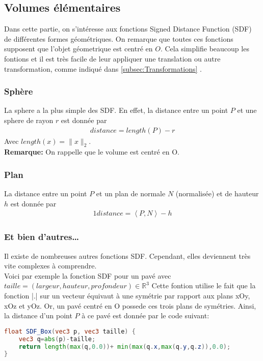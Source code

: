 \subsection{Volumes élémentaires}
Dans cette partie, on s'intéresse aux fonctions Signed Distance Function (SDF) de différentes formes géométriques. On remarque que toutes ces fonctions supposent que l'objet géometrique est centré en $O$. Cela simplifie beaucoup les fontions et il est très facile de leur appliquer une translation ou autre transformation, comme indiqué dans \ref{subsec:Transformations} .
\subsubsection{Sphère}
La sphere a la plus simple des SDF. En effet, la distance entre un point $P$ et une sphere de rayon $r$ est donnée par 
\begin{align*}
distance=length(P)-r
\end{align*}
Avec $length(x)=\|x\|_2$.
\\\textbf{Remarque:} On rappelle que le volume est centré en O.
\subsubsection{Plan}
La distance entre un point $P$ et un plan de normale $N$ (normalisée) et de hauteur $h$ est donnée par 
\begin{alignat*}{1}
    distance=\left\langle P,N \right\rangle - h
\end{alignat*}
\subsubsection{Et bien d'autres\ldots}
Il existe de nombreuses autres fonctions SDF. Cependant, elles deviennent très vite complexes à comprendre.\\
Voici par exemple la fonction SDF pour un pavé avec $taille=(largeur, hauteur, profondeur) \in \mathbb{R}^3$
Cette fontion utilise le fait que la fonction |.| sur un vecteur équivaut à une symétrie par rapport aux plans xOy, xOz et yOz. Or, un pavé centré en O possede ces trois plans de symétries. Ainsi, la distance d'un point $P$ à ce pavé est donnée par le code suivant:

\begin{lstlisting}[language=GLSL]
float SDF_Box(vec3 p, vec3 taille) {
	vec3 q=abs(p)-taille;
	return length(max(q,0.0))+ min(max(q.x,max(q.y,q.z)),0.0);
}
\end{lstlisting}